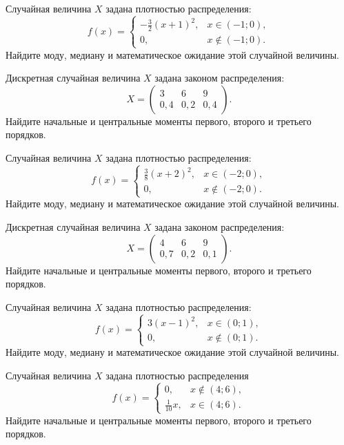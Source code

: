 \vfill

\newpage\setcounter{zad}{0}

\z Случайная величина $X$ задана плотностью распределения: $$f(x) = \begin{cases} -\frac{3}{2}(x+1)^2, & x \in (-1; 0), \\ 0, & x \not\in (-1; 0). \end{cases}$$ Найдите моду, медиану и математическое ожидание этой случайной величины.


\vfill

\z Дискретная случайная величина $X$ задана законом распределения: $$ X = \left(\begin{array}{rrr}3 & 6 & 9\\0{,}4 & 0{,}2 & 0{,}4\end{array}\right).$$ Найдите начальные и центральные моменты первого, второго и третьего порядков.
 

\vfill

\newpage\setcounter{zad}{0}

\z Случайная величина $X$ задана плотностью распределения: $$f(x) = \begin{cases} \frac{3}{8}(x+2)^2, & x \in (-2; 0), \\ 0, & x \not\in (-2; 0). \end{cases}$$ Найдите моду, медиану и математическое ожидание этой случайной величины.


\vfill

\z Дискретная случайная величина $X$ задана законом распределения: $$ X = \left(\begin{array}{rrr}4 & 6 & 9\\0{,}7 & 0{,}2 & 0{,}1\end{array}\right).$$ Найдите начальные и центральные моменты первого, второго и третьего порядков.
 

\vfill

\newpage\setcounter{zad}{0}

\z Случайная величина $X$ задана плотностью распределения: $$f(x) = \begin{cases} 3(x-1)^2, & x \in (0; 1), \\ 0, & x \not\in (0; 1). \end{cases}$$ Найдите моду, медиану и математическое ожидание этой случайной величины.


\vfill

\z Случайная величина $X$ задана плотностью распределения $$f(x) = \begin{cases}0, & x\not\in(4; 6), \\ \frac{1}{10}x, & x\in(4; 6).\end{cases}$$ Найдите начальные и центральные моменты первого, второго и третьего порядков.
 

